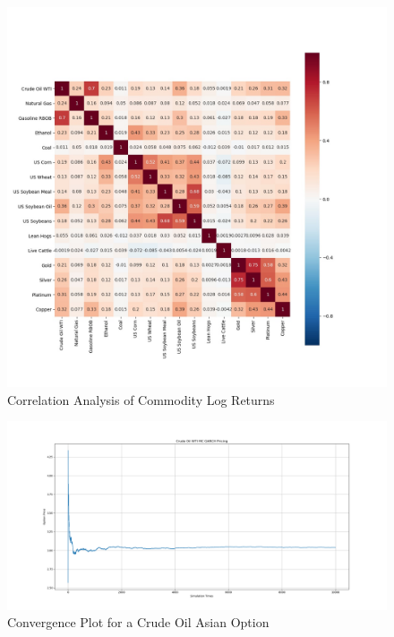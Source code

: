 \documentclass[10pt, a4paper, twocolumn]{article} %
\begin{document}
\begin{figure} [!ht]
	\includegraphics[width=\linewidth]{logRtCorrelation.jpg} %
	\caption{Correlation Analysis of Commodity Log Returns} %
	\label{logRtCorrelation} %
\end{figure}

\begin{figure} [!ht]
	\includegraphics[width=\linewidth]{Curdeoilmcconvergence1.png} %
	\caption{Convergence Plot for a Crude Oil Asian Option} %
	\label{oil conv} %
\end{figure}
\end{document}
